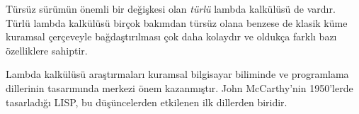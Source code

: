 \documentclass[../../../include/open-logic-section]{subfiles}
\begin{document}
\begin{digress}
Türsüz sürümün önemli bir değişkesi olan \emph{türlü} lambda kalkülüsü de
vardır. Türlü lambda kalkülüsü birçok bakımdan türsüz olana benzese de klasik
küme kuramsal çerçeveyle bağdaştırılması çok daha kolaydır ve oldukça farklı
bazı özelliklere sahiptir.

Lambda kalkülüsü araştırmaları kuramsal bilgisayar biliminde ve programlama
dillerinin tasarımında merkezi önem kazanmıştır. John McCarthy'nin 1950'lerde
tasarladığı LISP, bu düşüncelerden etkilenen ilk dillerden biridir.
\end{digress}
\end{document}
